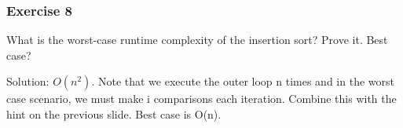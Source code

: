 \documentclass{beamer}
\begin{document}
\begin{frame} [noframenumbering]
\frametitle{Exercise 8}
What is the worst-case runtime complexity of the insertion sort? Prove it. Best case?
 \\
 \vspace{1cm}
 
Solution: $O(n^{2})$. Note that we execute the outer loop n times and in the worst case scenario, we must make i comparisons each iteration. Combine this with the hint on the previous slide. Best case is O(n).

\end{frame}

 
 

 

 
 
\end{document}
